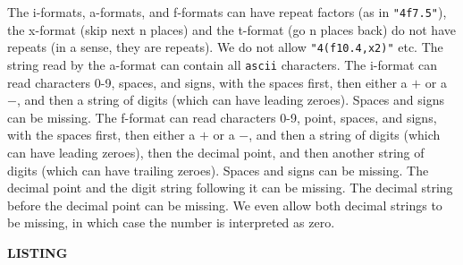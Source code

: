 \unorderedlist
\li The i-formats, a-formats, and f-formats can have repeat factors
(as in {\tt "4f7.5"}), the x-format (skip next n places) and
the t-format (go n places back) do not have repeats (in a sense,
they are repeats). 
\li We do not allow {\tt "4(f10.4,x2)"} etc.
\li The string read by the a-format can contain all {\tt ascii}
characters. 
\li The i-format can read characters 0-9, spaces, and signs,
with the spaces first, then either a $+$ or a $-$, and then
a string of digits (which can have leading zeroes). Spaces
and signs can be missing.
\li The f-format can read characters 0-9, point, spaces, and signs,
with the spaces first, then either a $+$ or a $-$, and then
a string of digits (which can have leading zeroes), then the
decimal point, and then another string of digits (which can have
trailing zeroes). Spaces and signs can be missing. The decimal
point and the digit string following it can be missing. The
decimal string before the decimal point can be missing. We even
allow both decimal strings to be missing, in which case the number
is interpreted as zero.
\endunorderedlist
\vfill\eject
\centerline{\bf LISTING}

\bye
